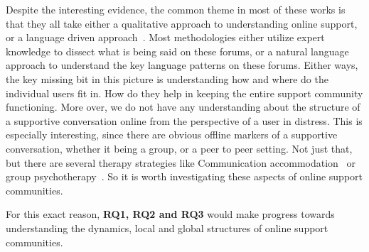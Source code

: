 Despite the interesting evidence, the common theme in most of these works is that they all take either a qualitative approach to understanding online support, or a language driven approach~\cite{de2014medical,de2016stroke,de2017adolescents}.
Most methodologies either utilize expert knowledge to dissect what is being said on these forums, or a natural language approach to understand the key language patterns on these forums. Either ways, the key missing bit in this picture is understanding how and where do the individual users fit in. How do they help in keeping the entire support community functioning. More over, we do not have any understanding about the structure of a supportive conversation online from the perspective of a user in distress. This is especially interesting, since there are obvious offline markers of a supportive conversation, whether it being a group, or a peer to peer setting. Not just that, but there are several therapy strategies like Communication accommodation~\cite{coupland1988introduction} or group psychotherapy~\cite{yalom_theory_1995}. So it is worth investigating these aspects of online support communities.

For this exact reason, \textbf{RQ1, RQ2 and RQ3} would make progress towards understanding the dynamics, local and global structures of online support communities.
 
